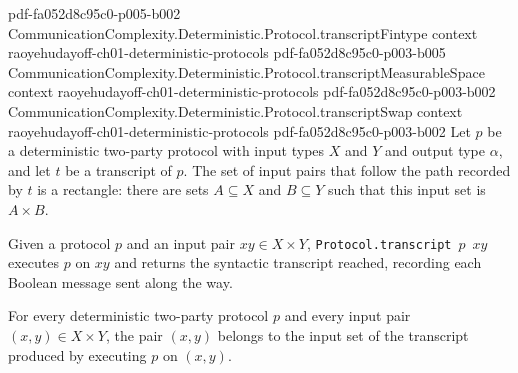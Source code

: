 \begin{theorem}
  {pdf-fa052d8c95c0-p005-b002}
\proofstep
  {CommunicationComplexity.Deterministic.Protocol.transcriptFintype}
  {context}
  {raoyehudayoff-ch01-deterministic-protocols}
  {pdf-fa052d8c95c0-p003-b005}
\proofstep
  {CommunicationComplexity.Deterministic.Protocol.transcriptMeasurableSpace}
  {context}
  {raoyehudayoff-ch01-deterministic-protocols}
  {pdf-fa052d8c95c0-p003-b002}
\proofstep
  {CommunicationComplexity.Deterministic.Protocol.transcriptSwap}
  {context}
  {raoyehudayoff-ch01-deterministic-protocols}
  {pdf-fa052d8c95c0-p003-b002}
Let $p$ be a deterministic two-party protocol with input types $X$ and $Y$ and output
type $\alpha$, and let $t$ be a transcript of $p$. The set of input pairs that follow
the path recorded by $t$ is a rectangle: there are sets $A\subseteq X$ and $B\subseteq
Y$ such that this input set is $A\times B$.
\end{theorem}

\begin{definition}
\label{CommunicationComplexity.Deterministic.Protocol.transcript}
\leanok
{}
Given a protocol $p$ and an input pair $xy \in X \times Y$, \texttt{Protocol.transcript}~$p$~$xy$
executes $p$ on $xy$ and returns the syntactic transcript reached, recording each Boolean
message sent along the way.
\end{definition}

\begin{theorem}
\label{CommunicationComplexity.Deterministic.Protocol.mem_transcript}
\leanok
{}
For every deterministic two-party protocol $p$ and every input pair $(x,y)\in X\times
Y$, the pair $(x,y)$ belongs to the input set of the transcript produced by executing
$p$ on $(x,y)$.
\end{theorem}

